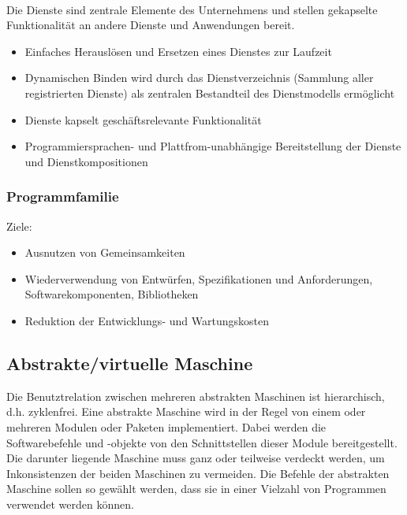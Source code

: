 
\\
Die Dienste sind zentrale Elemente des Unternehmens und stellen gekapselte Funktionalität an andere Dienste und Anwendungen bereit.
\begin{itemize}
    \item Einfaches Herauslösen und Ersetzen eines Dienstes zur Laufzeit
    \item Dynamischen Binden wird durch das Dienstverzeichnis (Sammlung aller registrierten Dienste) als zentralen Bestandteil des Dienstmodells ermöglicht
    \item Dienste kapselt geschäftsrelevante Funktionalität
    \item Programmiersprachen- und Plattfrom-unabhängige Bereitstellung der Dienste und Dienstkompositionen
\end{itemize}

\subsubsection{Programmfamilie}
Ziele:
\begin{itemize}
    \item Ausnutzen von Gemeinsamkeiten
    \item Wiederverwendung von Entwürfen, Spezifikationen und Anforderungen, Softwarekomponenten, Bibliotheken
    \item Reduktion der Entwicklungs- und Wartungskosten
\end{itemize}

\subsection{Abstrakte/virtuelle Maschine}
Die Benutztrelation zwischen mehreren abstrakten Maschinen ist hierarchisch, d.h. zyklenfrei.
Eine abstrakte Maschine wird in der Regel von einem oder mehreren Modulen oder Paketen implementiert. Dabei werden die Softwarebefehle und -objekte von den Schnittstellen dieser Module bereitgestellt.
Die darunter liegende Maschine muss ganz oder teilweise verdeckt werden, um Inkonsistenzen der beiden Maschinen zu vermeiden.
Die Befehle der abstrakten Maschine sollen so gewählt werden, dass sie in einer Vielzahl von Programmen verwendet werden können.